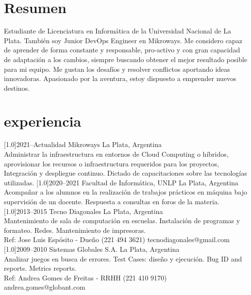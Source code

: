 \documentclass[espanol, print]{cv-style}     %
\begin{document}
\section{Resumen}
  \vspace{-0.3cm}
Estudiante de Licenciatura en Informática de la Universidad Nacional de La Plata.
También soy Junior DevOps Engineer en Mikroways.
Me considero capaz de aprender de forma constante y responsable, pro-activo y con gran capacidad de adaptación a los cambios, siempre buscando obtener el mejor resultado posible para mi equipo.
Me gustan los desafíos y resolver conflictos aportando ideas innovadoras.
Apasionado por la aventura, estoy dispuesto a emprender nuevos destinos.
\vspace{-0.2cm}
\section{experiencia}
  \vspace{-0.3cm}
\begin{entrylist}
\entry
  {\scalebox{.8}[1.0]{2021--Actualidad}}
  {Mikroways}
  {La Plata, Argentina}
  {\\
   Administrar la infraestructura en entornos de Cloud Computing o híbridos, aprovisionar los recursos o infraestructura requeridos para los proyectos, Integración y despliegue continuo. Dictado de capacitaciones sobre las tecnologías utilizadas.}
\entry
  {\scalebox{.8}[1.0]{2020--2021}}
  {Facultad de Informática, UNLP}
  {La Plata, Argentina}
  {\\
   Acompañar a los alumnos en la realización de trabajos prácticos en máquina
bajo supervisión de un docente. Respuesta a consultas en foros de la materia.}
\entry
  {\scalebox{.8}[1.0]{2013--2015}}
  {Tecno Diagonales}
  {La Plata, Argentina}
  {\\
  Mantenimiento de sala de computación en escuelas. Instalación de programas y formateo. Redes. Mantenimiento de impresoras.\\
  \small{Ref: Jose Luis Espósito - Dueño (221 494 3621) tecnodiagonales@gmail.com}}
\entry
  {\scalebox{.8}[1.0]{2009--2010}}
  {Sistemas Globales S.A.}
  {La Plata, Argentina}
  {\\
  Analizar juegos en busca de errores. Test Cases: diseño y ejecución. Bug ID and reports. Metrics reports.\\
  \small{Ref: Andrea Gomes de Freitas - RRHH (221 410 9170) andrea.gomes@globant.com}}
\end{entrylist}
\vspace{-0.4cm}
\end{document}
